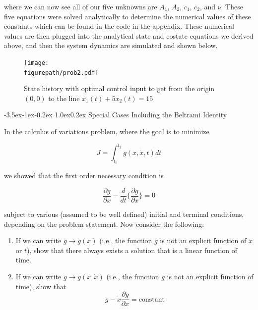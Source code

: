 \documentclass[11pt,letterpaper,onecolumn,notitlepage]{article}
\makeatletter
\newcommand{\figurepath}{../fig/hw3}
\renewcommand\section{\@startsection{section}{1}{\z@}%
{-3.5ex\@plus-1ex\@minus-0.2ex}%
{1.0ex\@plus0.2ex}%
{\fontsize{12pt}{12pt}\selectfont\bfseries\sffamily}}
\makeatother
\begin{document}
\begin{enumerate}
    where we can now see all of our five unknowns are $A_{1}$, $A_{2}$, $c_{1}$, $c_{2}$, and $\nu$.
    These five equations were solved analytically to determine the numerical values of these constants which can be found in the code in the appendix.
    These numerical values are then plugged into the analytical state and costate equations we derived above, and then the system dynamics are simulated and shown below.
  \end{enumerate}

  \begin{figure}[H]
    \centering
    \texttt{[image: \\figurepath/prob2.pdf]}
    \caption{State history with optimal control input to get from the origin $(0,0)$ to the line $x_{1}(t)+5x_{2}(t)=15$\label{fig:prob2}}
  \end{figure}

  \clearpage
  \section{Special Cases Including the Beltrami Identity}

  In the calculus of variations problem, where the goal is to minimize

  \begin{equation*}
    J=\int_{t_{0}}^{t_{f}}g(x,\dot{x},t)dt
  \end{equation*}

  we showed that the first order necessary condition is

  \begin{equation*}
    \frac{\partial{}g}{\partial{}x}-\frac{d}{dt}\biggr\{\frac{\partial{}g}{\partial\dot{x}}\biggr\}=0
  \end{equation*}

  subject to various (assumed to be well defined) initial and terminal conditions, depending on the problem statement.
  Now consider the following:

  \begin{enumerate}
    \item{If we can write $g\rightarrow g(\dot{x})$ (i.e., the function $g$ is not an explicit function of $x$ or $t$), show that there always exists a solution that is a linear function of time.}
    \item{If we can write $g\rightarrow g(x,\dot{x})$ (i.e., the function $g$ is not an explicit function of time), show that}
    \begin{equation*}
      g-\dot{x}\frac{\partial{}g}{\partial\dot{x}}=\text{constant}
    \end{equation*}
  \end{enumerate}
\end{document}

